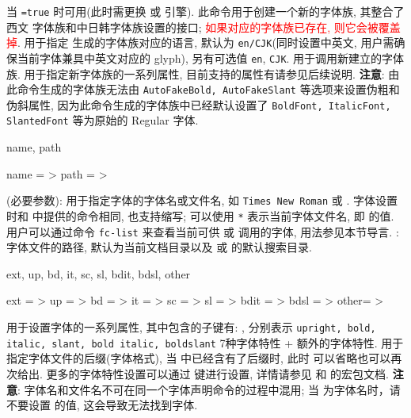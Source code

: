 \begin{function}[added=2025-04-26]{\zfontfamilynew}
  \begin{syntax}
  \end{syntax}
  当 \texttt{=true} 时可用(此时需更换  或  引擎). 此命令用于创建一个新的字体族, 其整合了西文
  字体族和中日韩字体族设置的接口; \textcolor{red}{\sffamily 如果对应的字体族已存在, 则它会被覆盖掉}.  用于指定
  生成的字体族对应的语言, 默认为 \texttt{en/CJK}(同时设置中英文, 用户需确保当前字体兼具中英文对应的 glyph), 另有可选值 \texttt{en}, \texttt{CJK}.
   用于调用新建立的字体族.  用于指定新字体族的一系列属性, 目前支持的属性有请参见后续说明. 
  \textbf{注意}: 由此命令生成的字体族无法由 \texttt{AutoFakeBold, AutoFakeSlant} 等选项来设置伪粗和伪斜属性,
  因为此命令生成的字体族中已经默认设置了 \texttt{BoldFont, ItalicFont, SlantedFont} 等为原始的 Regular 字体.
\end{function}


\begin{keyval}[parent=ztex/fontcfg/new]{name, path}
  \begin{syntax}
    name = >
    path = >
  \end{syntax}
  (必要参数): 用于指定字体的字体名或文件名, 如 \texttt{Times New Roman} 或 .
  字体设置时和  中提供的命令相同, 也支持缩写; 可以使用 \texttt{*} 表示当前字体文件名, 即  的值. 
  用户可以通过命令 \texttt{fc-list} 来查看当前可供  或  调用的字体, 用法参见本节导言.
  : 字体文件的路径, 默认为当前文档目录以及  或  的默认搜索目录.
\end{keyval}


\begin{keyval}[parent=ztex/fontcfg/new/feat]{ext, up, bd, it, sc, sl, bdit, bdsl, other}
  \begin{syntax}
    ext  = >
    up   = >\dval{*}
    bd   = >\dval{*}
    it   = >\dval{*}
    sc   = >\dval{*}
    sl   = >\dval{*}
    bdit = >\dval{*}
    bdsl = >\dval{*}
    other= >
  \end{syntax}
   用于设置字体的一系列属性, 其中包含的子键有: , 分别表示
  \texttt{upright, bold, italic, slant, bold italic, boldslant} 7种字体特性 + 额外的字体特性. 
  用于指定字体文件的后缀(字体格式), 当  中已经含有了后缀时, 此时 
  可以省略也可以再次给出. 更多的字体特性设置可以通过  键进行设置, 详情请参见  
  和  的宏包文档. 
  \textbf{注意}: 字体名和文件名不可在同一个字体声明命令的过程中混用; 当  为字体名时，请不要设置 
  的值, 这会导致无法找到字体.
\end{keyval}


